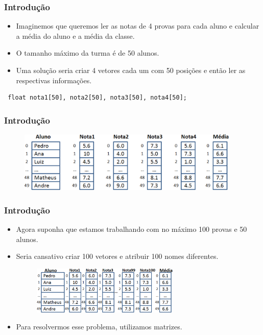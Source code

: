\documentclass[aspectratio=169]{beamer}
\begin{document}
\begin{frame}[fragile]
\frametitle{Introdução}
\begin{itemize}
\item Imaginemos que queremos ler as notas de 4 provas para cada aluno e calcular a média do aluno e a média da classe.
\item O tamanho máximo da turma é de 50 alunos.
\item Uma solução seria criar 4 vetores cada um com 50 posições e então ler as respectivas informações.
\end{itemize}
\begin{lstlisting}
 float nota1[50], nota2[50], nota3[50], nota4[50];
\end{lstlisting}
\end{frame}


\begin{frame}
\frametitle{Introdução}
\begin{figure}[!h]
  \centering
  \includegraphics[width=300pt]{imgs/vetores.png}
  \label{fig_vetores}
\end{figure}
\end{frame}


\begin{frame}
\frametitle{Introdução}
\begin{itemize}
\item Agora suponha que estamos trabalhando com no máximo 100 provas e 50 alunos.
\item Seria cansativo criar 100 vetores e atribuir 100 nomes diferentes.
\begin{figure}[!h]
  \centering
  \includegraphics[width=200pt]{imgs/vetores2.png}
  \label{fig_vetores2}
\end{figure}
\item Para resolvermos esse problema, utilizamos matrizes.
\end{itemize}
\end{frame}
\end{document}
